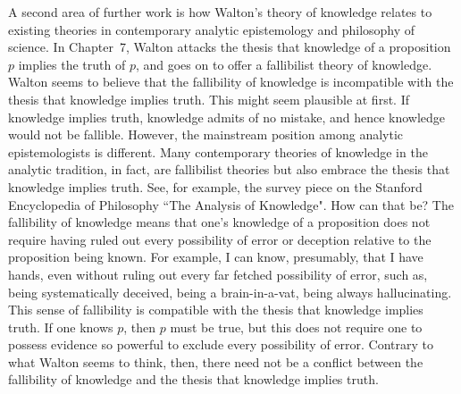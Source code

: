 \documentclass[12pt]{article}
\begin{document}
A second area of further work is how Walton's theory of knowledge relates to existing theories 
in contemporary analytic epistemology and philosophy of science. 
In Chapter~7, Walton attacks the thesis that knowledge of a proposition $p$ implies
the truth  of $p$, and goes on to offer a fallibilist theory of
knowledge. Walton seems to believe that the fallibility of knowledge is incompatible 
with the thesis that knowledge implies truth.  This might seem plausible at first. 
If knowledge implies truth, knowledge admits of no mistake, 
and hence knowledge would not be fallible. However, the mainstream position 
among analytic epistemologists is different. Many contemporary theories of
knowledge in the analytic tradition, in fact, are fallibilist theories
but also embrace the thesis that knowledge implies truth. See, for
example, the survey piece on the Stanford Encyclopedia of Philosophy
``The Analysis of Knowledge". How can that be? 
The fallibility of knowledge means that one's knowledge of a proposition 
does not require having ruled out every possibility of error or deception relative to the proposition 
being known. For example, I can know, 
presumably, that I have hands, even without ruling out every far fetched possibility of error, such as, being systematically 
deceived, being a brain-in-a-vat, being always hallucinating. This sense of fallibility is compatible with 
the thesis that knowledge implies truth. If one knows $p$, then $p$ must be true, but this does not require one to possess evidence 
so powerful to exclude every possibility of error. 
Contrary to what Walton seems to think, then, there need not be a conflict between the 
fallibility of knowledge and the thesis that
knowledge implies truth. 
\end{document}
